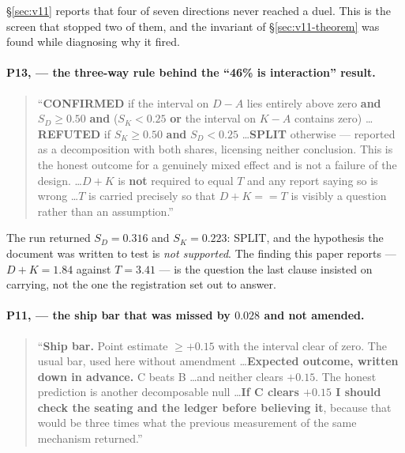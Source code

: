 \noindent \S\ref{sec:v11} reports that four of seven directions never reached a
duel. This is the screen that stopped two of them, and the invariant of
\S\ref{sec:v11-theorem} was found while diagnosing why it fired.

\paragraph{P13, \protect{} --- the three-way rule
behind the ``46\% is interaction'' result.}

\begin{quote}
``\textbf{CONFIRMED} if the interval on $D - A$ lies entirely above zero
\textbf{and} $S_D \geq 0.50$ \textbf{and} ($S_K < 0.25$ \textbf{or} the
interval on $K - A$ contains zero) \ldots \textbf{REFUTED} if $S_K \geq 0.50$
\textbf{and} $S_D < 0.25$ \ldots \textbf{SPLIT} otherwise --- reported as a
decomposition with both shares, licensing neither conclusion. This is the
honest outcome for a genuinely mixed effect and is not a failure of the design.
\ldots $D + K$ is \textbf{not} required to equal $T$ and any report saying so
is wrong \ldots $T$ is carried precisely so that $D + K == T$ is visibly a
question rather than an assumption.''
\end{quote}

\noindent The run returned $S_D = 0.316$ and $S_K = 0.223$: SPLIT, and the
hypothesis the document was written to test is \emph{not supported}. The
finding this paper reports --- $D + K = 1.84$ against $T = 3.41$ --- is the
question the last clause insisted on carrying, not the one the registration set
out to answer.

\paragraph{P11, \protect{} --- the ship bar that was
missed by $0.028$ and not amended.}

\begin{quote}
``\textbf{Ship bar.} Point estimate $\geq +0.15$ with the interval clear of
zero. The usual bar, used here without amendment \ldots \textbf{Expected
outcome, written down in advance.} C beats B \ldots and neither clears $+0.15$.
The honest prediction is another decomposable null \ldots \textbf{If C clears
$+0.15$ I should check the seating and the ledger before believing it}, because
that would be three times what the previous measurement of the same mechanism
returned.''
\end{quote}

